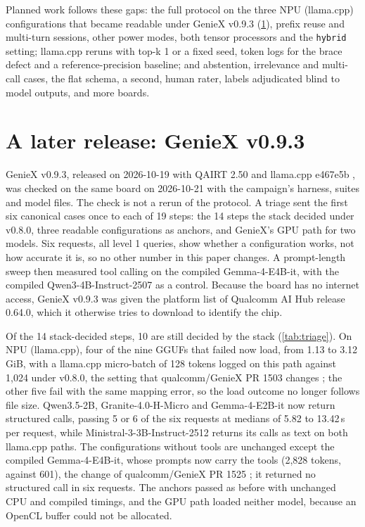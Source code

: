 \documentclass[11pt]{article}
\begin{document}
Planned work follows these gaps: the full protocol on the three NPU (llama.cpp) configurations that became readable under GenieX v0.9.3 (\cref{sec:addendum}), prefix reuse and multi-turn sessions, other power modes, both tensor processors and the \texttt{hybrid} setting; llama.cpp reruns with top-k 1 or a fixed seed, token logs for the brace defect and a reference-precision baseline; and abstention, irrelevance and multi-call cases, the flat schema, a second, human rater, labels adjudicated blind to model outputs, and more boards.

\section{A later release: GenieX v0.9.3}\label{sec:addendum}

GenieX v0.9.3, released on 2026-10-19 with QAIRT 2.50 and llama.cpp e467e5b \citep{geniex2026}, was checked on the same board on 2026-10-21 with the campaign's harness, suites and model files. The check is not a rerun of the protocol. A triage sent the first six canonical cases once to each of 19 steps: the 14 steps the stack decided under v0.8.0, three readable configurations as anchors, and GenieX's GPU path for two models. Six requests, all level 1 queries, show whether a configuration works, not how accurate it is, so no other number in this paper changes. A prompt-length sweep then measured tool calling on the compiled Gemma-4-E4B-it, with the compiled Qwen3-4B-Instruct-2507 as a control. Because the board has no internet access, GenieX v0.9.3 was given the platform list of Qualcomm AI Hub release 0.64.0, which it otherwise tries to download to identify the chip.

Of the 14 stack-decided steps, 10 are still decided by the stack (\cref{tab:triage}). On NPU (llama.cpp), four of the nine GGUFs that failed now load, from 1.13 to 3.12\,GiB, with a llama.cpp micro-batch of 128 tokens logged on this path against 1,024 under v0.8.0, the setting that qualcomm/GenieX PR 1503 changes \citep{geniexPR1503}; the other five fail with the same mapping error, so the load outcome no longer follows file size. Qwen3.5-2B, Granite-4.0-H-Micro and Gemma-4-E2B-it now return structured calls, passing 5 or 6 of the six requests at medians of 5.82 to 13.42\,s per request, while Ministral-3-3B-Instruct-2512 returns its calls as text on both llama.cpp paths. The configurations without tools are unchanged except the compiled Gemma-4-E4B-it, whose prompts now carry the tools (2,828 tokens, against 601), the change of qualcomm/GenieX PR 1525 \citep{geniexPR1525}; it returned no structured call in six requests. The anchors passed as before with unchanged CPU and compiled timings, and the GPU path loaded neither model, because an OpenCL buffer could not be allocated.
\end{document}
